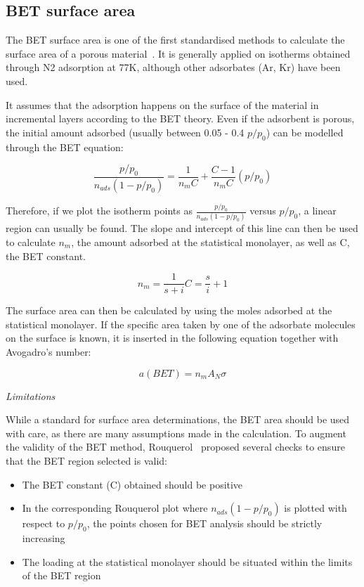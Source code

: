 
\subsection{BET surface area}

The BET surface area is one of the first standardised methods to calculate the
surface area of a porous material~\cite{brunauerAdsorptionGasesMultimolecular1938}. 
It is generally applied on isotherms obtained
through N2 adsorption at 77K, although other adsorbates (Ar, Kr) have been used.

It assumes that the adsorption happens on the surface of the material in
incremental layers according to the BET theory. Even if the adsorbent is porous,
the initial amount adsorbed (usually between 0.05 - 0.4 \(p/p_0\)) can be
modelled through the BET equation:

\begin{equation}
    \frac{p/p_0}{n_{ads} (1-p/p_0)} = \frac{1}{n_{m} C} + \frac{C - 1}{n_{m} C}(p/p_0)
\end{equation}


Therefore, if we plot the isotherm points as
\(\frac{p/p_0}{n_{ads}(1-p/p_0)}\) versus \(p/p_0\), a linear region
can usually be found. The slope and intercept of this line
can then be used to calculate \(n_{m}\), the amount adsorbed at the
statistical monolayer, as well as C, the BET constant.

\begin{equation}
    n_{m} = \frac{1}{s+i}
    C = \frac{s}{i} + 1
\end{equation}

The surface area can then be calculated by using the moles
adsorbed at the statistical monolayer. If the specific area taken
by one of the adsorbate molecules on the surface is known, it is
inserted in the following equation together with Avogadro's number:

\begin{equation}
    a(BET) = n_m A_N \sigma
\end{equation}


\emph{Limitations}

While a standard for surface area determinations, the BET area
should be used with care, as there are many assumptions made in
the calculation. To augment the validity of the BET
method, Rouquerol~\cite{rouquerolAdsorptionPowdersPorous2013} proposed
several checks to ensure that the BET region selected is valid:

\begin{itemize}

	\item The BET constant (C) obtained should be positive
    \item In the corresponding Rouquerol plot where \(n_{ads}(1-p/p_0)\)
    is plotted with respect to \(p/p_0\), the points chosen for BET
	analysis should be strictly increasing
	\item The loading at the statistical monolayer should be
	situated within the limits of the BET region

\end{itemize}



